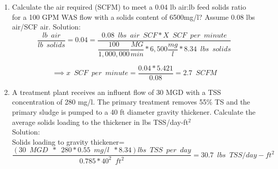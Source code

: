 \begin{enumerate}
\item Calculate the air required (SCFM) to meet a 0.04 lb air:lb feed solids ratio for a 100 GPM WAS flow
with a solids content of 6500mg/l? Assume 0.08 lbs air/SCF air.
Solution:
$$\dfrac{lb \enspace air}{lb \enspace solids}=0.04=\dfrac{0.08 \enspace lbs \enspace air \enspace SCF * X \enspace SCF \enspace per \enspace minute}{\dfrac{100}{1,000,000}\dfrac{MG}{min}*6,500\dfrac{mg}{l}*8.34 \enspace lbs \enspace solids}$$

$$\implies x \enspace SCF \enspace per \enspace minute = \dfrac{0.04*5.421}{0.08}=\boxed{2.7 \enspace SCFM}$$

\item A treatment plant receives an influent flow of 30 MGD with a TSS concentration of 280 mg/l.  The primary treatment removes 55\% TS and the primary sludge is pumped to a 40 ft diameter gravity thickener.  Calculate the average solids loading to the thickener in lbs TSS/day-ft$^2$\\
Solution:\\
 
Solids loading to gravity thickener=$\dfrac{(30 \enspace MGD \enspace * \enspace 280*0.55 \enspace mg/l \enspace *8.34) lbs \enspace TSS \enspace per  \enspace day}{0.785*40^2 \enspace ft^2}=\boxed{30.7 \enspace lbs \enspace TSS/day-ft^2}$

\end{enumerate}
